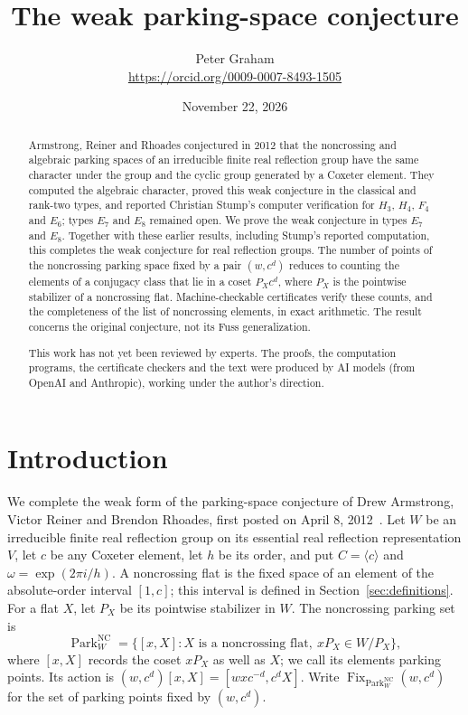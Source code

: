 \documentclass[11pt]{article}
\title{The weak parking-space conjecture}
\author{Peter Graham\\ \small\url{https://orcid.org/0009-0007-8493-1505}}
\date{November 22, 2026}
\newcommand{\NC}{\operatorname{NC}}
\newcommand{\Fix}{\operatorname{Fix}}
\newcommand{\Park}{\operatorname{Park}}
\begin{document}
\maketitle
\begin{abstract}
Armstrong, Reiner and Rhoades conjectured in 2012 that the noncrossing
and algebraic parking spaces of an irreducible finite real reflection
group have the same character under the group and the cyclic group
generated by a Coxeter element. They computed the algebraic character,
proved this weak conjecture in the classical and rank-two types, and
reported Christian Stump's computer verification for $H_3$, $H_4$,
$F_4$ and $E_6$; types $E_7$ and $E_8$ remained open. We prove the weak conjecture in types $E_7$ and $E_8$.
Together with these earlier results, including Stump's reported
computation, this completes the weak conjecture for real reflection
groups. The number of points of the noncrossing parking space fixed by a
pair $(w,c^d)$ reduces to counting the elements of a conjugacy class that
lie in a coset $P_Xc^d$, where $P_X$ is the pointwise stabilizer of a
noncrossing flat. Machine-checkable certificates verify these counts, and
the completeness of the list of noncrossing elements, in exact
arithmetic. The result concerns the original conjecture, not its Fuss
generalization.

This work has not yet been reviewed by experts. The proofs, the computation programs, the certificate checkers and the text were produced by AI models (from OpenAI and Anthropic), working under the author's direction.
\end{abstract}
\medskip

\section{Introduction}
We complete the weak form of the parking-space conjecture of Drew
Armstrong, Victor Reiner and Brendon Rhoades, first posted on
April 8, 2012~\cite{ARR}. Let $W$ be an irreducible finite real
reflection group on its essential real reflection representation $V$, let $c$ be any Coxeter
element, let $h$ be its order, and put $C=\langle c\rangle$ and
$\omega=\exp(2\pi i/h)$. A noncrossing flat is the fixed space of an
element of the absolute-order interval $[1,c]$; this interval is defined
in Section~\ref{sec:definitions}. For a flat $X$, let $P_X$ be its
pointwise stabilizer in $W$. The noncrossing parking set is
\[
 \Park^{\NC}_W=\{[x,X]: X\text{ is a noncrossing flat},\ xP_X\in W/P_X\},
\]
where $[x,X]$ records the coset $xP_X$ as well as $X$; we call its
elements parking points. Its action is
$(w,c^d)[x,X]=[wxc^{-d},c^dX]$. Write
$\Fix_{\Park^{\NC}_W}(w,c^d)$ for the set of parking points fixed by
$(w,c^d)$.
\end{document}
